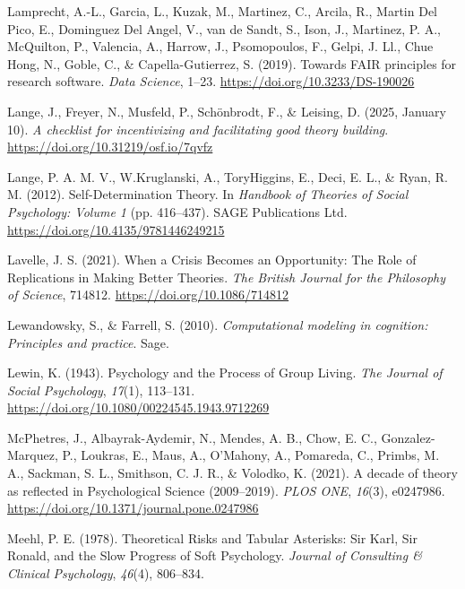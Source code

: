 \documentclass[
  man, noextraspace,floatsintext]{apa7}
\newlength{\cslhangindent}
\newenvironment{CSLReferences}[2] %
 {\begin{list}{}{%
  \setlength{\itemindent}{0pt}
  \setlength{\leftmargin}{0pt}
  \setlength{\parsep}{0pt}
  \ifodd #1
   \setlength{\leftmargin}{\cslhangindent}
   \setlength{\itemindent}{-1\cslhangindent}
  \fi
  \setlength{\itemsep}{#2\baselineskip}}}
 {\end{list}}
\begin{document}
\begin{CSLReferences}{1}{0}
Lamprecht, A.-L., Garcia, L., Kuzak, M., Martinez, C., Arcila, R., Martin Del Pico, E., Dominguez Del Angel, V., van de Sandt, S., Ison, J., Martinez, P. A., McQuilton, P., Valencia, A., Harrow, J., Psomopoulos, F., Gelpi, J. Ll., Chue Hong, N., Goble, C., \& Capella-Gutierrez, S. (2019). Towards {FAIR} principles for research software. \emph{Data Science}, 1--23. \url{https://doi.org/10.3233/DS-190026}

Lange, J., Freyer, N., Musfeld, P., Schönbrodt, F., \& Leising, D. (2025, January 10). \emph{A checklist for incentivizing and facilitating good theory building}. \url{https://doi.org/10.31219/osf.io/7qvfz}

Lange, P. A. M. V., W.Kruglanski, A., ToryHiggins, E., Deci, E. L., \& Ryan, R. M. (2012). Self-{Determination Theory}. In \emph{Handbook of {Theories} of {Social Psychology}: {Volume} 1} (pp. 416--437). SAGE Publications Ltd. \url{https://doi.org/10.4135/9781446249215}

Lavelle, J. S. (2021). When a {Crisis Becomes} an {Opportunity}: {The Role} of {Replications} in {Making Better Theories}. \emph{The British Journal for the Philosophy of Science}, 714812. \url{https://doi.org/10.1086/714812}

Lewandowsky, S., \& Farrell, S. (2010). \emph{Computational modeling in cognition: {Principles} and practice}. Sage.

Lewin, K. (1943). Psychology and the {Process} of {Group Living}. \emph{The Journal of Social Psychology}, \emph{17}(1), 113--131. \url{https://doi.org/10.1080/00224545.1943.9712269}

McPhetres, J., Albayrak-Aydemir, N., Mendes, A. B., Chow, E. C., Gonzalez-Marquez, P., Loukras, E., Maus, A., O'Mahony, A., Pomareda, C., Primbs, M. A., Sackman, S. L., Smithson, C. J. R., \& Volodko, K. (2021). A decade of theory as reflected in {Psychological Science} (2009--2019). \emph{PLOS ONE}, \emph{16}(3), e0247986. \url{https://doi.org/10.1371/journal.pone.0247986}

Meehl, P. E. (1978). Theoretical {Risks} and {Tabular Asterisks}: {Sir Karl}, {Sir Ronald}, and the {Slow Progress} of {Soft Psychology}. \emph{Journal of Consulting \& Clinical Psychology}, \emph{46}(4), 806--834.


\end{CSLReferences}
\end{document}
